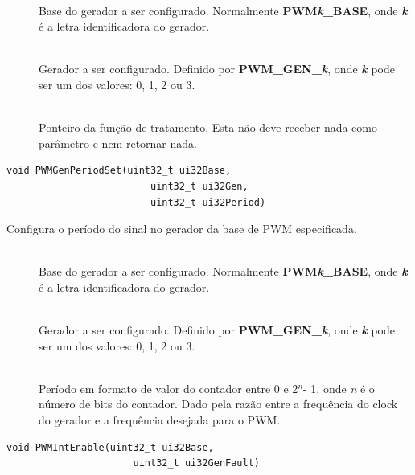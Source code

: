 \begin{description}
	\item []\hfill \\
	Base do gerador a ser configurado. Normalmente \textbf{PWM\emph{k}\_BASE}, onde \textbf{\emph{k}} é a letra identificadora do gerador.
	
	\item []\hfill \\
	Gerador a ser configurado. Definido por \textbf{PWM\_GEN\_\emph{k}}, onde \textbf{\emph{k}} pode ser um dos valores: 0, 1, 2 ou 3.
	
	\item []\hfill \\
	Ponteiro da função de tratamento. Esta não deve receber nada como parâmetro e nem retornar nada.
\end{description}

\begin{lstlisting}[style=funcao]
	void PWMGenPeriodSet(uint32_t ui32Base,
						 uint32_t ui32Gen,
						 uint32_t ui32Period)
\end{lstlisting}

Configura o período do sinal no gerador da base de PWM especificada.

\begin{description}
	\item []\hfill \\
	Base do gerador a ser configurado. Normalmente \textbf{PWM\emph{k}\_BASE}, onde \textbf{\emph{k}} é a letra identificadora do gerador.
	
	\item []\hfill \\
	Gerador a ser configurado. Definido por \textbf{PWM\_GEN\_\emph{k}}, onde \textbf{\emph{k}} pode ser um dos valores: 0, 1, 2 ou 3.
	
	\item []\hfill \\
	Período em formato de valor do contador entre 0 e 2$^n$- 1, onde \emph{n} é o número de bits do contador. Dado pela razão entre a frequência do clock do gerador e a frequência desejada para o PWM.
\end{description}

\begin{lstlisting}[style=funcao]
	void PWMIntEnable(uint32_t ui32Base,
					  uint32_t ui32GenFault)
\end{lstlisting}

